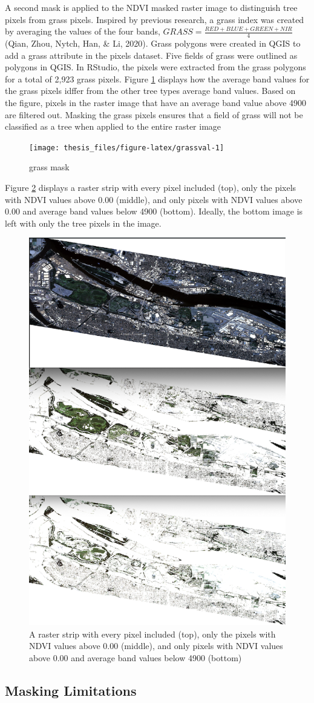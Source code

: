 \documentclass[12pt,twoside]{reedthesis}
\begin{document}
A second mask is applied to the NDVI masked raster image to distinguish tree pixels from grass pixels. Inspired by previous research, a grass index was created by averaging the values of the four bands, \(GRASS = \frac{RED + BLUE + GREEN + NIR}{4}\) (Qian, Zhou, Nytch, Han, \& Li, 2020). Grass polygons were created in QGIS to add a grass attribute in the pixels dataset. Five fields of grass were outlined as polygons in QGIS. In RStudio, the pixels were extracted from the grass polygons for a total of 2,923 grass pixels. Figure \ref{fig:grassval} displays how the average band values for the grass pixels idffer from the other tree types average band values. Based on the figure, pixels in the raster image that have an average band value above 4900 are filtered out. Masking the grass pixels ensures that a field of grass will not be classified as a tree when applied to the entire raster image
\begin{figure}

{\centering \texttt{[image: thesis\_files/figure-latex/grassval-1]} 

}

\caption{grass mask}\label{fig:grassval}
\end{figure}
Figure \ref{fig:beforeaftermask} displays a raster strip with every pixel included (top), only the pixels with NDVI values above 0.00 (middle), and only pixels with NDVI values above 0.00 and average band values below 4900 (bottom). Ideally, the bottom image is left with only the tree pixels in the image.
\begin{figure}

{\centering \includegraphics[width=0.4\linewidth]{figure/beforeaftermask} 

}

\caption{A raster strip with every pixel included (top), only the pixels with NDVI values above 0.00 (middle), and only pixels with NDVI values above 0.00 and average band values below 4900 (bottom)}\label{fig:beforeaftermask}
\end{figure}
\hypertarget{masking-limitations}{%
\subsection{Masking Limitations}\label{masking-limitations}}
\end{document}
